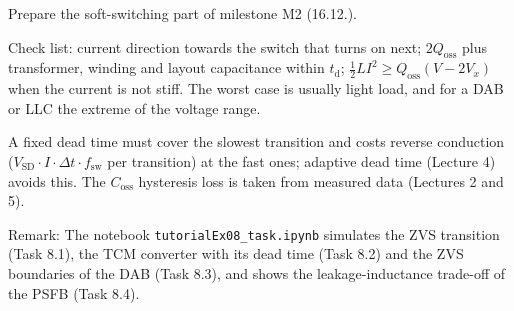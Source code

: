 

Prepare the soft-switching part of milestone M2 (16.12.).


\begin{solutionblock}
	Check list: current direction towards the switch that turns on next; $2Q_\mathrm{oss}$ plus transformer, winding and layout capacitance within $t_\mathrm{d}$; $\frac{1}{2}LI^2\geq Q_\mathrm{oss}(V-2V_x)$ when the current is not stiff. The worst case is usually light load, and for a DAB or LLC the extreme of the voltage range.
\end{solutionblock}


\begin{solutionblock}
	A fixed dead time must cover the slowest transition and costs reverse conduction ($V_\mathrm{SD}\cdot I\cdot\Delta t\cdot f_\mathrm{sw}$ per transition) at the fast ones; adaptive dead time (Lecture 4) avoids this. The $C_\mathrm{oss}$ hysteresis loss is taken from measured data (Lectures 2 and 5).
\end{solutionblock}

\vspace{0.5cm}
Remark: The notebook \texttt{tutorialEx08\_task.ipynb} simulates the ZVS transition (Task 8.1), the TCM converter with its dead time (Task 8.2) and the ZVS boundaries of the DAB (Task 8.3), and shows the leakage-inductance trade-off of the PSFB (Task 8.4).
